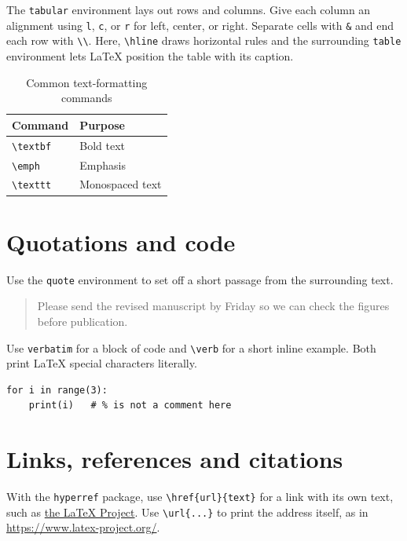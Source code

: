 \documentclass[11pt]{article}
\begin{document}
The \verb|tabular| environment lays out rows and columns. Give each column an alignment using \verb|l|, \verb|c|, or \verb|r| for left, center, or right. Separate cells with \verb|&| and end each row with \verb|\\|. Here, \verb|\hline| draws horizontal rules and the surrounding \verb|table| environment lets LaTeX position the table with its caption.

\begin{table}[htbp]
  \centering
  \begin{tabular}{ll}
    \hline
    Command & Purpose \\
    \hline
    \verb|\textbf| & Bold text \\
    \verb|\emph| & Emphasis \\
    \verb|\texttt| & Monospaced text \\
    \hline
  \end{tabular}
  \caption{Common text-formatting commands}
\end{table}

\section{Quotations and code}

Use the \verb|quote| environment to set off a short passage from the surrounding text.

\begin{quote}
  Please send the revised manuscript by Friday so we can check the figures before publication.
\end{quote}

Use \verb|verbatim| for a block of code and \verb|\verb| for a short inline example. Both print LaTeX special characters literally.

\begin{verbatim}
for i in range(3):
    print(i)   # % is not a comment here
\end{verbatim}

\section{Links, references and citations}\label{sec:links}

With the \verb|hyperref| package, use \verb|\href{url}{text}| for a link with its own text, such as \href{https://www.latex-project.org/}{the LaTeX Project}. Use \verb|\url{...}| to print the address itself, as in \url{https://www.latex-project.org/}.
\end{document}
